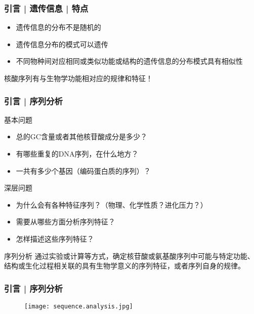 \begin{frame}
  \frametitle{引言 | 遗传信息 | 特点}
  \begin{itemize}
    \item 遗传信息的分布不是随机的
    \item 遗传信息分布的模式可以遗传
    \item 不同物种间对应相同或类似功能或结构的遗传信息的分布模式具有相似性
  \end{itemize}
  \begin{center}
    \Large{核酸序列有与生物学功能相对应的规律和特征！}
  \end{center}
\end{frame}

\begin{frame}
  \frametitle{引言 | 序列分析}
  \begin{block}{基本问题}
    \begin{itemize}
      \item 总的GC含量或者其他核苷酸成分是多少？
      \item 有哪些重复的DNA序列，在什么地方？
      \item 一共有多少个基因（编码蛋白质的序列）？
    \end{itemize}
  \end{block}
  \vspace{-0.3em}
  \pause
  \begin{block}{深层问题}
    \begin{itemize}
      \item 为什么会有各种特征序列？（物理、化学性质？进化压力？）
      \item 需要从哪些方面分析序列特征？
      \item 怎样描述这些序列特征？
    \end{itemize}
  \end{block}
  \vspace{-0.3em}
  \pause
  \begin{block}{序列分析}
    通过实验或计算等方式，确定核苷酸或氨基酸序列中可能与特定功能、结构或生化过程相关联的\alert{具有生物学意义的序列特征}，或者\alert{序列自身的规律}。
  \end{block}
\end{frame}

\begin{frame}
  \frametitle{引言 | 序列分析}
  \begin{figure}
    \centering
    \texttt{[image: sequence.analysis.jpg]}
  \end{figure}
\end{frame}


